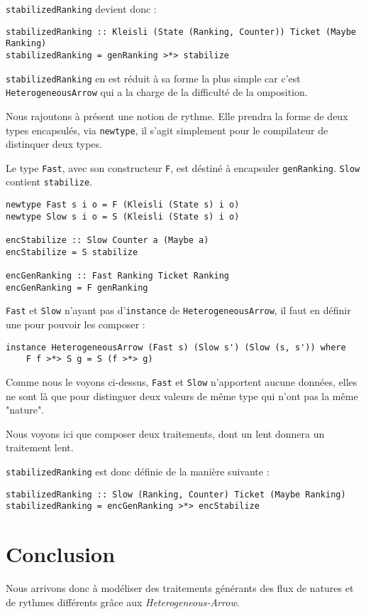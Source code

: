 \documentclass{llncs}
\newcommand{\SAp}{\emph{Heterogeneous-Arrow}. }
\newcommand{\HA}{\lstinline{HeterogeneousArrow} }
\newcommand{\HAv}{\lstinline{HeterogeneousArrow}, }
\begin{document}
\lstinline{stabilizedRanking} devient donc :
\begin{lstlisting}
stabilizedRanking :: Kleisli (State (Ranking, Counter)) Ticket (Maybe Ranking)
stabilizedRanking = genRanking >*> stabilize
\end{lstlisting}
\lstinline{stabilizedRanking} en est réduit à sa forme la plus simple car c'est
\HA qui a la charge de la difficulté de la omposition.

Nous rajoutons à présent une notion de rythme.
Elle prendra la forme de deux types encapsulés, via \lstinline{newtype}, il s'agit
simplement pour le compilateur de distinquer deux types.

Le type \lstinline{Fast}, avec son constructeur \lstinline{F}, est déstiné à
encapsuler \lstinline{genRanking}.
\lstinline{Slow} contient \lstinline{stabilize}.
\begin{lstlisting}
newtype Fast s i o = F (Kleisli (State s) i o)
newtype Slow s i o = S (Kleisli (State s) i o)

encStabilize :: Slow Counter a (Maybe a)
encStabilize = S stabilize

encGenRanking :: Fast Ranking Ticket Ranking
encGenRanking = F genRanking
\end{lstlisting}

\lstinline{Fast} et \lstinline{Slow} n'ayant pas d'\lstinline{instance} de \HAv
il faut en définir une pour pouvoir les composer :
\begin{lstlisting}
instance HeterogeneousArrow (Fast s) (Slow s') (Slow (s, s')) where
    F f >*> S g = S (f >*> g)
\end{lstlisting}
Comme nous le voyons ci-dessus, \lstinline{Fast} et \lstinline{Slow} n'apportent
aucune données, elles ne sont là que pour distinguer deux valeurs de même type qui
n'ont pas la même "nature".

Nous voyons ici que composer deux traitements, dont un lent donnera un traitement
lent.

\lstinline{stabilizedRanking} est donc définie de la manière suivante :
\begin{lstlisting}
stabilizedRanking :: Slow (Ranking, Counter) Ticket (Maybe Ranking)
stabilizedRanking = encGenRanking >*> encStabilize
\end{lstlisting}

\section{Conclusion}
Nous arrivons donc à modéliser des traitements générants des flux de natures et de
rythmes différents grâce aux \SAp
\end{document}
